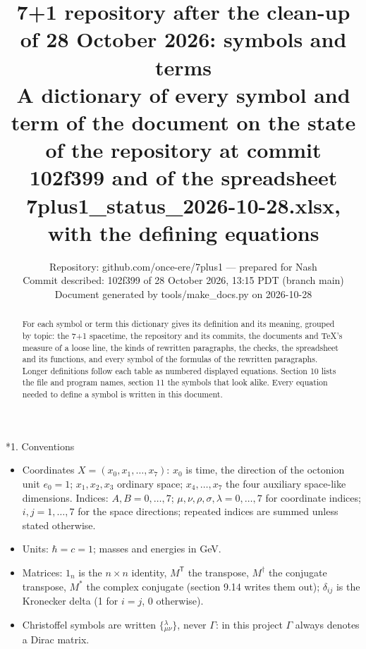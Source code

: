 \documentclass[10pt,a4paper]{article}
\makeatletter
\renewcommand\section{\@startsection{section}{1}{\z@}{-3.5ex \@plus -1ex \@minus -.2ex}{2.3ex \@plus.2ex}{\normalfont\Large\bfseries\raggedright}}
\makeatother
\begin{document}
\title{7+1 repository after the clean-up of 28 October 2026: symbols and terms\\[0.4em]\large A dictionary of every symbol and term of the document on the state of the repository at commit 102f399 and of the spreadsheet 7plus1\_status\_2026-10-28.xlsx, with the defining equations}
\author{Repository: github.com/once-ere/7plus1 — prepared for Nash\\ Commit described: 102f399 of 28 October 2026, 13:15 PDT (branch main)\\ Document generated by tools/make\_docs.py on 2026-10-28}
\date{}
\maketitle
\begin{abstract}
For each symbol or term this dictionary gives its definition and its meaning, grouped by topic: the 7+1 spacetime, the repository and its commits, the documents and TeX’s measure of a loose line, the kinds of rewritten paragraphs, the checks, the spreadsheet and its functions, and every symbol of the formulas of the rewritten paragraphs. Longer definitions follow each table as numbered displayed equations. Section 10 lists the file and program names, section 11 the symbols that look alike. Every equation needed to define a symbol is written in this document.
\end{abstract}
\tableofcontents
{}\section*{1. Conventions}
\begin{itemize}
\item Coordinates $X=(x_0,x_1,\dots,x_7)$: $x_0$ is time, the direction of the octonion unit $e_0=1$; $x_1,x_2,x_3$ ordinary space; $x_4,\dots,x_7$ the four auxiliary space-like dimensions. Indices: $A,B=0,\dots,7$; $\mu,\nu,\rho,\sigma,\lambda=0,\dots,7$ for coordinate indices; $i,j=1,\dots,7$ for the space directions; repeated indices are summed unless stated otherwise.
\item Units: $\hbar=c=1$; masses and energies in GeV.
\item Matrices: $1_n$ is the $n\times n$ identity, $M^{\mathsf T}$ the transpose, $M^\dagger$ the conjugate transpose, $M^*$ the complex conjugate (section 9.14 writes them out); $\delta_{ij}$ is the Kronecker delta (1 for $i=j$, 0 otherwise).
\item Christoffel symbols are written $\{{}^{\lambda}_{\mu\nu}\}$, never $\Gamma$: in this project $\Gamma$ always denotes a Dirac matrix.
\end{itemize}
\end{document}

